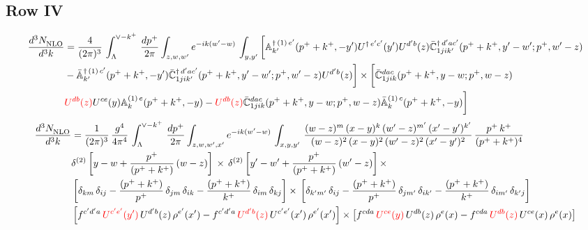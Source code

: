 \documentclass[9pt]{article}
\def\mf#1{\mathbb{#1}}
\numberwithin{equation}{section}
\begin{document}
\subsection{Row IV\,}
\begin{align}
    \frac{d^{3}N_{\rm NLO}^{\rm}}{d^{3}k}  & = \frac{4}{(2\pi)^{3}}\,\int_{\Lambda}^{\vee-k^{+}}\, \frac{dp^{+}}{2\pi}\int_{z,w,w^{\prime}} e^{-ik(w^{\prime}-w)}\,  \int_{y,y^{\prime}}\bigg[\mf{A}^{\dagger\, (1)\,e^{\prime}}_{k^{\prime}}(p^{+}+k^{+},-y^{\prime})U^{\dagger\, e^{\prime}c^{\prime}}(y^{\prime})U^{d^{\prime}b}(z) \Bar{\mf{C}}^{\dagger\, d^{\prime}ac^{\prime}}_{1jik^{\prime}}(p^{+}+k^{+},y^{\prime}-w^{\prime}; p^{+},w^{\prime}-z) \notag \\ &  -\Bar{\mf{A}}^{\dagger\, (1)\,c^{\prime}}_{k^{\prime}}(p^{+}+k^{+},-y^{\prime}) \Bar{\mf{C}}^{\dagger\, d^{\prime}ac^{\prime}}_{1jik^{\prime}}(p^{+}+k^{+},y^{\prime}-w^{\prime}; p^{+},w^{\prime}-z)U^{d^{\prime}b}(z)\bigg]\times\bigg[\Bar{\mf{C}}^{dac}_{1jik}(p^{+}+k^{+},y-w; p^{+},w-z)\notag \\ & {\color{red}U^{db}(z)}U^{ce}(y) \mf{A}^{(1)\,e}_{k}(p^{+}+k^{+},-y) -{\color{red}U^{db}(z)} \Bar{\mf{C}}^{dac}_{1jik}(p^{+}+k^{+},y-w; p^{+},w-z)\Bar{\mf{A}}^{(1)\,c}_{k}(p^{+}+k^{+},-y)\bigg]\nonumber
\end{align}
\begin{align}
     \frac{d^{3}N_{\rm NLO}^{\rm}}{d^{3}k}  & = \frac{1}{(2\pi)^{3}}\,\frac{g^{4}}{4\pi^{4}}\,\int_{\Lambda}^{\vee-k^{+}}\, \frac{dp^{+}}{2\pi}\int_{z,w,w^{\prime},x'} e^{-ik(w^{\prime}-w)}\,  \int_{x,y,y^{\prime}}\,\frac{(w-z)^{m}\,(x-y)^{k}\,(w'-z)^{m'}\,(x'-y')^{k'}}{(w-z)^{2}\,(x-y)^{2}\,(w'-z)^{2}\,(x'-y')^{2}}\,\frac{p^{+}\,k^{+}}{(p^{+}+k^{+})^{4}}\notag \\ & \delta^{(2)}\left[y-w+\frac{p^{+}}{(p^{+}+k^{+})}\,(w-z)\right]\,\times\, \delta^{(2)}\left[y'-w'+\frac{p^{+}}{(p^{+}+k^{+})}\,(w'-z)\right]\times\notag \\ &  \left[\delta_{km}\,\delta_{ij}-\frac{(p^{+}+k^{+})}{p^{+}}\,\delta_{jm}\,\delta_{ik}-\frac{(p^{+}+k^{+})}{k^{+}}\,\delta_{im}\,\delta_{kj}\right]\times\, \left[\delta_{k'm'}\,\delta_{ij}-\frac{(p^{+}+k^{+})}{p^{+}}\,\delta_{jm'}\,\delta_{ik'}-\frac{(p^{+}+k^{+})}{k^{+}}\,\delta_{im'}\,\delta_{k'j}\right]\notag \\ & \left[f^{c'd'a}\,{\color{red}U^{c'e'}(y')}\,U^{d'b}(z)\,\rho^{e'}(x')-f^{c'd'a}\, 
    {\color{red}U^{d'b}(z)}\,U^{c'e'}(x')\,\rho^{e'}(x')\right]\times \left[f^{cda}\,{\color{red}U^{ce}(y)}\,U^{db}(z)\,\rho^{e}(x)-f^{cda}\, 
    {\color{red}U^{db}(z)}\,U^{ce}(x)\,\rho^{e}(x)\right]
\end{align}
\end{document}

